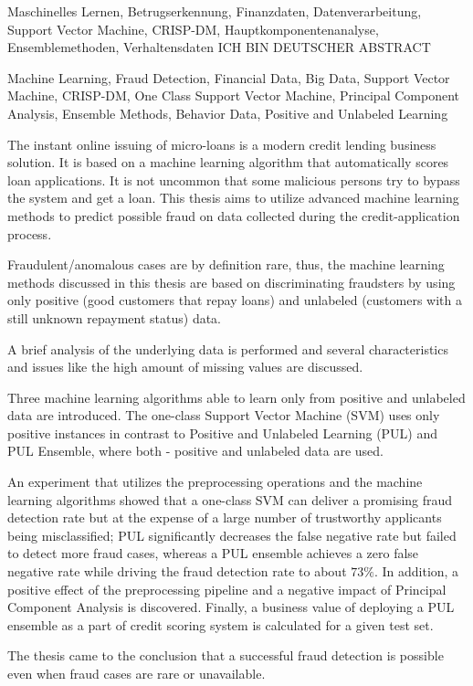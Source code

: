 \documentclass[draft=false
              ,paper=a4
              ,twoside=false
              ,fontsize=11pt
              ,headsepline
              ,BCOR10mm
              ,DIV11
              ]{scrbook}
\begin{document}
\HAWAbstractPage
{
    Maschinelles Lernen, 
    Betrugserkennung, 
    Finanzdaten, 
    Datenverarbeitung, 
    Support Vector Machine, 
    CRISP-DM, 
    Hauptkomponentenanalyse, 
    Ensemblemethoden, 
    Verhaltensdaten
}
{ 
    ICH BIN DEUTSCHER ABSTRACT
}
{
    Machine Learning, 
    Fraud Detection, 
    Financial Data, 
    Big Data, 
    Support Vector Machine, 
    CRISP-DM, 
    One Class Support Vector Machine, 
    Principal Component Analysis, 
    Ensemble Methods, Behavior Data, 
    Positive and Unlabeled Learning
    
}
{ 
      The instant online issuing of micro-loans is a modern credit lending business solution. It is based on a machine learning algorithm that automatically scores loan applications.
      It is not uncommon that some malicious persons try to bypass the system and get a loan. 
      This thesis aims to utilize advanced machine learning methods to predict possible fraud on data collected during the credit-application process. 

      Fraudulent/anomalous cases are by definition rare, thus, the machine learning methods discussed in this thesis are based on discriminating fraudsters by using only positive (good customers that repay loans) and unlabeled (customers with a still unknown repayment status) data. 

      A brief analysis of the underlying data is performed and several characteristics and issues like the high amount of missing values are discussed.

      Three machine learning algorithms able to learn only from positive and unlabeled data are introduced. The one-class Support Vector Machine (SVM) uses only positive instances in contrast to Positive and Unlabeled Learning (PUL) and PUL Ensemble, where both - positive and unlabeled data are used. 

      An experiment that utilizes the preprocessing operations and the machine learning algorithms showed that a one-class SVM can deliver a promising fraud detection rate but at the expense of a large number of trustworthy applicants being misclassified; PUL significantly decreases the false negative rate but failed to detect more fraud cases, whereas a PUL ensemble achieves a zero false negative rate while driving the fraud detection rate to about \(73\%\). In addition, a positive effect of the preprocessing pipeline and a negative impact of Principal Component Analysis is discovered. Finally, a business value of deploying a PUL ensemble as a part of credit scoring system is calculated for a given test set.

      The thesis came to the conclusion that a successful fraud detection is possible even when fraud cases are rare or unavailable.
}
\end{document}
